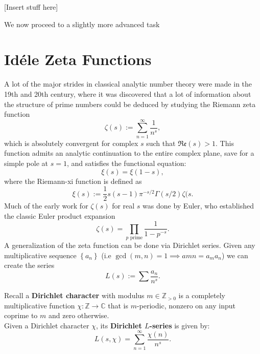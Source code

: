 \documentclass[11pt, x11names]{book}
\newcommand{\zz}{\mathbb{Z}}
\newcommand{\cc}{\mathbb{C}}
\newcommand{\set}[1]{\left\{ #1 \right\}}
\newcommand{\re}[1]{\mathfrak{Re} \left( #1 \right)}
\begin{document}
[Insert stuff here]

We now proceed to a slightly more advanced task

\newpage

\section{Id\'ele Zeta Functions}
\label{section: Id\'ele Zeta Functions}
A lot of the major strides in classical analytic number theory were made in the 19th and 20th century, where it was discovered that a lot of information about the structure of prime numbers could be deduced by studying the Riemann zeta function
\begin{equation*}
    \zeta(s) := \sum^\infty_{n=1} \frac{1}{n^s},
\end{equation*}
which is absolutely convergent for complex $s$ such that $\re{s} > 1$. This function admits an analytic continuation to the entire complex plane, save for a simple pole at $s=1$, and satisfies the functional equation:
\begin{equation*}
    \xi(s) = \xi(1-s),
\end{equation*}
where the Riemann-xi function is defined as
\begin{equation*}
    \xi(s) := \frac{1}{2}s(s-1)\pi^{-s/2} \Gamma(s/2) \zeta(s.
\end{equation*}
Much of the early work for $\zeta(s)$ for real $s$ was done by Euler, who established the classic Euler product expansion
\begin{equation*}
    \zeta(s) = \prod_{p \text{ prime}} \frac{1}{1-p^{-s}}.
\end{equation*}
A generalization of the zeta function can be done via Dirichlet series. Given any multiplicative sequence $\set{a_n}$ (i.e $\gcd(m, n) = 1 \implies a{mn} = a_ma_n$) we can create the series 
\begin{equation*}
    L(s) := \sum \frac{a_n}{n^s}.
\end{equation*}

\begin{example}
\label{example: Dirichlet L-func}
    Recall a \textbf{Dirichlet character} with modulus $m \in \zz_{> 0}$ is a completely multiplicative function $\chi: \zz \to \cc$ that is $m$-periodic, nonzero on any input coprime to $m$ and zero otherwise.\\
    Given a Dirichlet character $\chi$, its \textbf{Dirichlet $L$-series} is given by:
    \begin{equation*}
        L(s, \chi) = \sum^\infty_{n=1} \frac{\chi(n)}{n^s}.
    \end{equation*}
\end{example}
\end{document}
